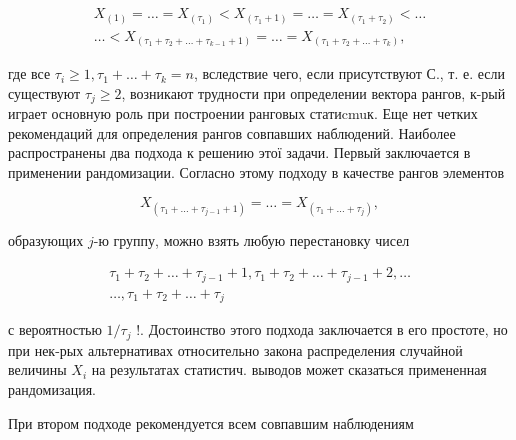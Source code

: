 \documentclass[10pt]{article}
\begin{document}
\[

\begin{gathered}

X_{(1)}=\ldots=X_{\left(\tau_{1}\right)}<X_{\left(\tau_{1}+1\right)}=\ldots=X_{\left(\tau_{1}+\tau_{2}\right)}<\ldots \\

\ldots<X_{\left(\tau_{1}+\tau_{2}+\ldots+\tau_{k-1}+1\right)}=\ldots=X_{\left(\tau_{1}+\tau_{2}+\ldots+\tau_{k}\right)},

\end{gathered}

\]



где все $\tau_{i} \geqslant 1, \tau_{1}+\ldots+\tau_{k}=n$, вследствие чего, если присутствуют С., т. е. если существуют $\tau_{j} \geqslant 2$, возникают трудности при определении вектора рангов, к-рый играет основную роль при построении ранговых статиcmuк. Еще нет четких рекомендаций для определения рангов совпавших наблюдений. Наиболее распространены два подхода к решению этої задачи. Первый заключается в применении рандомизации. Согласно этому подходу в качестве рангов элементов



\[

X_{\left(\tau_{1}+\ldots+\tau_{j-1}+1\right)}=\ldots=X_{\left(\tau_{1}+\ldots+\tau_{j}\right)},

\]



образующих $j$-ю группу, можно взять любую перестановку чисел



\[

\begin{gathered}

\tau_{1}+\tau_{2}+\ldots+\tau_{j-1}+1, \tau_{1}+\tau_{2}+\ldots+\tau_{j-1}+2, \ldots \\

\ldots, \tau_{1}+\tau_{2}+\ldots+\tau_{j}

\end{gathered}

\]



с вероятностью $1 / \tau_{j}$ !. Достоинство этого подхода заключается в его простоте, но при нек-рых альтернативах относительно закона распределения случайноӥ величины $X_{i}$ на результатах статистич. выводов может сказаться примененная рандомизация.



При втором подходе рекомендуется всем совпавшим наблюдениям
\end{document}
